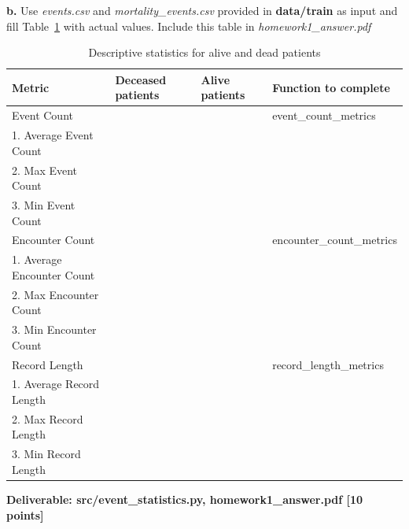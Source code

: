 \documentclass[12pt]{article}
\begin{document}
\textbf{b.} Use \textit{events.csv} and \textit{mortality\_events.csv} provided in \textbf{data/train} as input and fill Table~\ref{tbl:stat} with actual values. Include this table in \textit{homework1\_answer.pdf}\\

\begin{table}[th]
\centering
\begin{tabular}{@{}l|l|l|l@{}}
\toprule
Metric & Deceased patients & Alive patients & Function to complete \\ \hline
Event Count & & & event\_count\_metrics \\ 
1. Average Event Count &&& \\
2. Max Event Count  &&&\\
3. Min Event Count  &&&\\ \hline

Encounter Count & & & encounter\_count\_metrics \\ 
1. Average Encounter Count  &&&\\
2. Max Encounter Count  &&&\\
3. Min Encounter Count  &&&\\ \hline

Record Length & & & record\_length\_metrics \\ 
1. Average Record Length &&&\\
2. Max Record Length&&& \\
3. Min Record Length&&& \\ 
\bottomrule
\end{tabular}
\caption{Descriptive statistics for alive and dead patients}
\label{tbl:stat}
\end{table} 

\textbf{Deliverable: src/event\_statistics.py, homework1\_answer.pdf  [10 points]}
\end{document}
